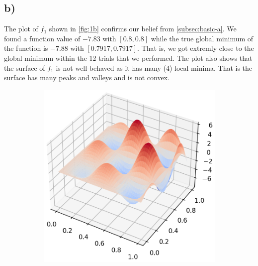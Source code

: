 \documentclass[11pt]{article}
\begin{document}
\subsection{b)}\label{subsec:basic-b}

The plot of $f_1$ shown in \autoref{fig:1b} confirms our belief from \autoref{subsec:basic-a}. We found a function value of $-7.83$ with $[0.8, 0.8]$ while the true global minimum of the function is $-7.88$ with $[0.7917, 0.7917]$. That is, we got extremly close to the global minimum within the 12 trials that we performed. The plot also shows that the surface of $f_1$ is not well-behaved as it has many (4) local minima. That is the surface has many peaks and valleys and is not convex. 

\begin{figure}[H]
	\centering
	\begin{subfigure}[b]{0.47\textwidth}
		\centering
		\includegraphics[width=\textwidth]{assets/1b-3d}
		\caption{}
	\end{subfigure}
	\begin{subfigure}[b]{0.47\textwidth}
		\centering

\end{subfigure}
\end{figure}
\end{document}

